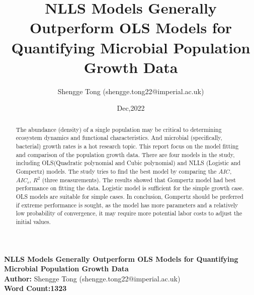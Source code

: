 \documentclass[11pt]{article}
\title{NLLS Models Generally Outperform OLS Models for Quantifying Microbial Population Growth Data}
\author{Shengge Tong (shengge.tong22@imperial.ac.uk)}
\date{Dec,2022}
\begin{document}
\begin{titlepage}

  \centering

    \vspace*{3cm}
    \Huge
    \textbf{NLLS Models Generally Outperform OLS Models for Quantifying Microbial Population Growth Data}\\
    
    \vspace*{2cm}
    \Large
    \textbf{Author:} Shengge Tong (shengge.tong22@imperial.ac.uk)\\
    \vspace*{1cm}
    \textbf{Word Count:1323} 

  \end{titlepage}
\newpage
\tableofcontents
\newpage
{}
 
  \begin{abstract}
    The abundance (density) of a single population may be critical to determining ecosystem dynamics and functional characteristics. And microbial (specifically, bacterial) growth rates is a hot research topic.
    This report focus on the model fitting and comparison of the population growth data. There are four models in the study, including OLS(Quadratic polynomial and Cubic polynomial) and NLLS (Logistic and Gompertz) models. The study tries to find the best model by comparing the $AIC$, $AIC_c$, $R^2$ (three measurements). 
    The results showed that Gompertz model had best performance on fitting the data. Logistic model is sufficient for the simple growth case. OLS models are suitable for simple cases.
    In conclusion, Gompertz should be preferred if extreme performance is sought, as the model has more parameters and a relatively low probability of convergence, it may require more potential labor costs to adjust the initial values.
    \newline
  \end{abstract}
\newpage
\end{document}
